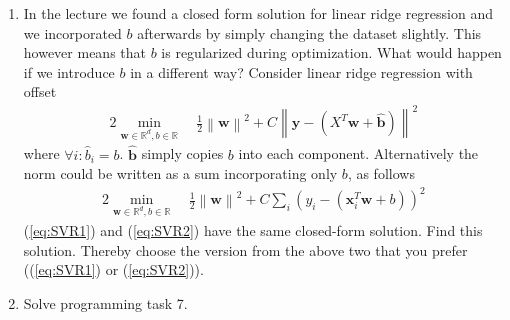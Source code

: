 \documentclass[]{scrartcl}
\newcommand{\R}{\mathbb{R}}
\newcommand{\bx}{\mathbf{x}}
\newcommand{\bb}{\mathbf{b}}
\newcommand{\bw}{\mathbf{w}}
\newcommand{\by}{\mathbf{y}}
\begin{document}
\begin{enumerate}
\newpage
\item In the lecture we found a closed form solution for linear ridge regression and we incorporated $b$ afterwards by simply changing the dataset slightly. This however means that $b$ is regularized during optimization. What would happen if we introduce $b$ in a different way? Consider linear ridge regression with offset
\begin{alignat}{2}
	\label{eq:SVR1}
   \min_{\bw \in \R^d, b \in \R}~&  \frac{1}{2}\left\lVert\bw\right\rVert^2 + C\left\lVert\by-(X^T\bw+\hat{\bb})\right\rVert^2
\end{alignat}
where $\forall i: \hat{b}_i=b$. $\hat{\bb}$ simply copies $b$ into each component. Alternatively the norm could be written as a sum incorporating only $b$, as follows
\begin{alignat}{2}
	\label{eq:SVR2}
   \min_{\bw \in \R^d, b \in \R}~&  \frac{1}{2}\left\lVert\bw\right\rVert^2 + C\sum_i\left(y_i-(\bx_i^T\bw+b)\right)^2
\end{alignat}
(\ref{eq:SVR1}) and (\ref{eq:SVR2}) have the same closed-form solution. Find this solution. Thereby choose the version from the above two that you prefer ((\ref{eq:SVR1}) or (\ref{eq:SVR2})). 

\item Solve programming task 7.
\end{enumerate}
\end{document}
